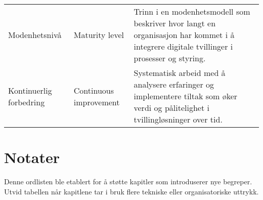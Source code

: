 \begin{longtable}{p{}p{}p{}}
Modenhetsnivå & Maturity level & Trinn i en modenhetsmodell som beskriver hvor langt en organisasjon har kommet i å integrere digitale tvillinger i prosesser og styring. \\
Kontinuerlig forbedring & Continuous improvement & Systematisk arbeid med å analysere erfaringer og implementere tiltak som øker verdi og pålitelighet i tvillingløsninger over tid. \\
\bottomrule
\end{longtable}

\section{Notater}
Denne ordlisten ble etablert for å støtte kapitler som introduserer nye begreper. Utvid tabellen når kapitlene tar i bruk flere tekniske eller organisatoriske uttrykk.

